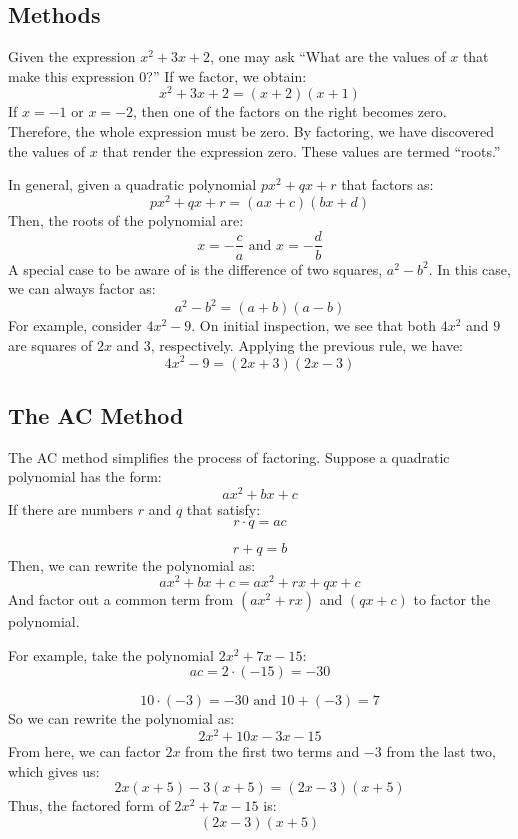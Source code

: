 \subsection{Methods}
\label{sss:meth-a9ac}

Given the expression $x^2 + 3x + 2$, one may ask ``What are the values of $x$ that make this expression 0?'' If we factor, we obtain:
\[
x^2 + 3x + 2 = (x + 2)(x + 1)
\]
If $x = -1$ or $x = -2$, then one of the factors on the right becomes zero. Therefore, the whole expression must be zero. By factoring, we have discovered the values of $x$ that render the expression zero. These values are termed ``roots.''

In general, given a quadratic polynomial $px^2 + qx + r$ that factors as:
\[
px^2 + qx + r = (ax + c)(bx + d)
\]
Then, the roots of the polynomial are:
\[
x = -\frac{c}{a} \text{ and } x = -\frac{d}{b}
\]
A special case to be aware of is the difference of two squares, $a^2 - b^2$. In this case, we can always factor as:
\[
a^2 - b^2 = (a + b)(a - b)
\]
For example, consider $4x^2 - 9$. On initial inspection, we see that both $4x^2$ and $9$ are squares of $2x$ and $3$, respectively. Applying the previous rule, we have:
\[
4x^2 - 9 = (2x + 3)(2x - 3)
\]

\subsection{The AC Method}
\label{sss:thea-afe9}

The AC method simplifies the process of factoring. Suppose a quadratic polynomial has the
form:
\[
ax^2 + bx + c
\]
If there are numbers $r$ and $q$ that satisfy:
\[
r \cdot q = ac
\]

\[
r + q = b
\]
Then, we can rewrite the polynomial as:
\[
ax^2 + bx + c = ax^2 + rx + qx + c
\]
And factor out a common term from $(ax^2 + rx)$ and $(qx + c)$ to factor the polynomial.

For example, take the polynomial $2x^2 + 7x - 15$:
\[
ac = 2 \cdot (-15) = -30
\]

\[
10 \cdot (-3) = -30 \text{ and } 10 + (-3) = 7
\]
So we can rewrite the polynomial as:
\[
2x^2 + 10x - 3x - 15
\]
From here, we can factor $2x$ from the first two terms and $-3$ from the last two, which gives us:
\[
2x(x + 5) - 3(x + 5) = (2x - 3)(x + 5)
\]
Thus, the factored form of $2x^2 + 7x - 15$ is:
\[
(2x - 3)(x + 5)
\]

